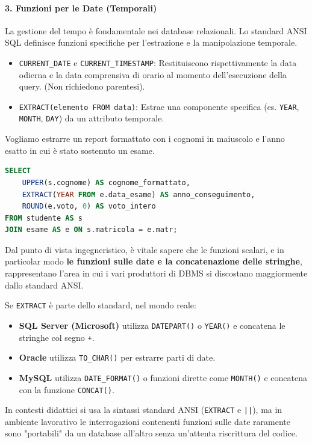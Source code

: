 \paragraph{3. Funzioni per le Date (Temporali)}
La gestione del tempo è fondamentale nei database relazionali. Lo standard ANSI SQL definisce funzioni specifiche per l'estrazione e la manipolazione temporale.
\begin{itemize}
    \item \texttt{CURRENT\_DATE} e \texttt{CURRENT\_TIMESTAMP}: Restituiscono rispettivamente la data odierna e la data comprensiva di orario al momento dell'esecuzione della query. (Non richiedono parentesi).
    \item \texttt{EXTRACT(elemento FROM data)}: Estrae una componente specifica (es. \texttt{YEAR}, \texttt{MONTH}, \texttt{DAY}) da un attributo temporale.
\end{itemize}

\begin{example}
Vogliamo estrarre un report formattato con i cognomi in maiuscolo e l'anno esatto in cui è stato sostenuto un esame.
\begin{lstlisting}[language=SQL, basicstyle=\ttfamily\small, keywordstyle=\color{blue}\bfseries]
SELECT 
    UPPER(s.cognome) AS cognome_formattato,
    EXTRACT(YEAR FROM e.data_esame) AS anno_conseguimento,
    ROUND(e.voto, 0) AS voto_intero
FROM studente AS s
JOIN esame AS e ON s.matricola = e.matr;
\end{lstlisting}
\end{example}

\begin{warningbox}
Dal punto di vista ingegneristico, è vitale sapere che le funzioni scalari, e in particolar modo \textbf{le funzioni sulle date e la concatenazione delle stringhe}, rappresentano l'area in cui i vari produttori di DBMS si discostano maggiormente dallo standard ANSI. 

Se \texttt{EXTRACT} è parte dello standard, nel mondo reale:
\begin{itemize}
    \item \textbf{SQL Server (Microsoft)} utilizza \texttt{DATEPART()} o \texttt{YEAR()} e concatena le stringhe col segno \texttt{+}.
    \item \textbf{Oracle} utilizza \texttt{TO\_CHAR()} per estrarre parti di date.
    \item \textbf{MySQL} utilizza \texttt{DATE\_FORMAT()} o funzioni dirette come \texttt{MONTH()} e concatena con la funzione \texttt{CONCAT()}.
\end{itemize}
In contesti didattici si usa la sintassi standard ANSI (\texttt{EXTRACT} e \texttt{||}), ma in ambiente lavorativo le interrogazioni contenenti funzioni sulle date raramente sono "portabili" da un database all'altro senza un'attenta riscrittura del codice.
\end{warningbox}

